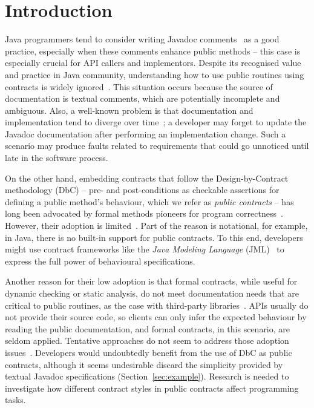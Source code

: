 \section{Introduction}
\label{sec:introduction}

Java programmers tend to consider writing Javadoc comments~\cite{javadoc-oracle} as a good practice,
especially when these comments enhance public methods -- this case is especially crucial for API callers and implementors. Despite its recognised value and practice in Java community, understanding how to use public routines using contracts is widely ignored~\cite{liveAPI}.
This situation occurs because the source of documentation is textual comments, which are potentially incomplete and ambiguous. Also, a well-known problem is that documentation and implementation tend to diverge over time~\cite{Estler-etal14}; 
a developer may forget to update the Javadoc documentation after performing an implementation change. Such a scenario may produce faults related to requirements that could go unnoticed until late in the software process.

On the other hand, embedding contracts that follow the Design-by-Contract methodology (DbC) -- pre- and post-conditions as checkable assertions for defining a public method's behaviour, which we refer as \emph{public contracts} -- has
long been advocated by formal methods pioneers for program correctness~\cite{Hoare1969,Parnas2011}. 
However, their adoption is limited~\cite{Polikarpova-etal09}. 
Part of the reason is notational, for example, in Java, there is no built-in support for public contracts.
To this end, developers might use contract frameworks like the \emph{Java Modeling Language} (JML)~\cite{jml} to express the full power of behavioural specifications.

Another reason for their low adoption is that formal contracts, while useful for dynamic checking or static analysis, do not meet documentation needs that are critical to public routines, as the case with third-party libraries~\cite{Leavens10,Parnas2011}.
APIs usually do not provide their source code, so clients can only infer the expected behaviour by reading the public documentation, and formal contracts, in this scenario, are seldom applied.
Tentative approaches do not seem to address those adoption issues~\cite{docAnalysis}.
Developers would undoubtedly benefit from the use of DbC as public contracts, although it seems undesirable discard the simplicity provided by textual Javadoc specifications (Section~\ref{sec:example}).
Research is needed to investigate how different contract styles in public contracts affect programming tasks.

